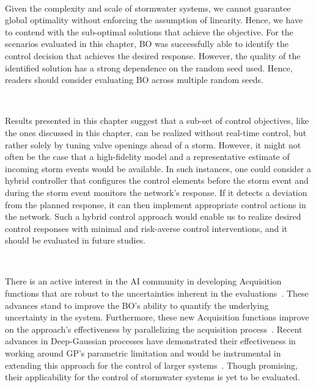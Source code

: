 \

Given the complexity and scale of stormwater systems, we cannot guarantee global optimality without enforcing the assumption of linearity. 
Hence, we have to contend with the sub-optimal solutions that achieve the objective. 
For the scenarios evaluated in this chapter, BO was successfully able to identify the control decision that achieves the desired response.
However, the quality of the identified solution has a strong dependence on the random seed used.
Hence, readers should consider evaluating BO across multiple random seeds.

\

Results presented in this chapter suggest that a sub-set of control objectives, like the ones discussed in this chapter, can be realized without real-time control, but rather solely by tuning valve openings ahead of a storm. 
However, it might not often be the case that a high-fidelity model and a representative estimate of incoming storm events would be available. 
In such instances, one could consider a hybrid controller that configures the control elements before the storm event and during the storm event monitors the network's response.
If it detects a deviation from the planned response, it can then implement appropriate control actions in the network.
Such a hybrid control approach would enable us to realize desired control responses with minimal and risk-averse control interventions, and it should be evaluated in future studies.

\


There is an active interest in the AI community in developing Acquisition functions that are robust to the uncertainties inherent in the evaluations~\cite{letham2019}.
These advances stand to improve the BO's ability to quantify the underlying uncertainty in the system. 
Furthermore, these new Acquisition functions improve on the approach's effectiveness by parallelizing the acquisition process~\cite{frazier2018tutorial}. 
Recent advances in Deep-Gaussian processes have demonstrated their effectiveness in working around GP's parametric limitation and would be instrumental in extending this approach for the control of larger systems~\cite{damianou2013deep}.
Though promising, their applicability for the control of stormwater systems is yet to be evaluated. 

